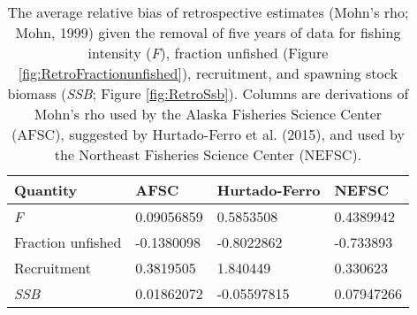
\begin{longtable}[t]{llll}
\caption{\label{tab:RetroMohnsrho}The average relative bias of retrospective estimates (Mohn's rho; Mohn, 1999) given the removal of five years of data for fishing intensity (\emph{F}), fraction unfished (Figure \ref{fig:RetroFractionunfished}),  recruitment, and spawning stock biomass (\emph{SSB}; Figure \ref{fig:RetroSsb}). Columns are derivations of Mohn's rho used by the Alaska Fisheries Science Center (AFSC), suggested by Hurtado-Ferro et al. (2015), and used by the Northeast Fisheries Science Center (NEFSC).}\\
\toprule
Quantity & AFSC & Hurtado-Ferro & NEFSC\\
\midrule
\emph{F} & 0.09056859 & 0.5853508 & 0.4389942\\
Fraction unfished & -0.1380098 & -0.8022862 & -0.733893\\
Recruitment & 0.3819505 & 1.840449 & 0.330623\\
\emph{SSB} & 0.01862072 & -0.05597815 & 0.07947266\\
\bottomrule
\end{longtable}

